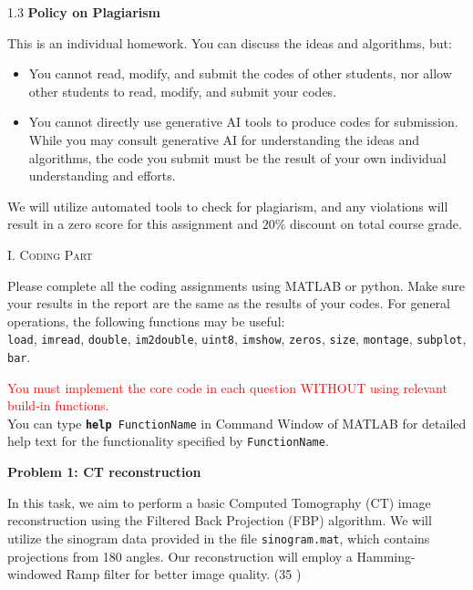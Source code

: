 \documentclass[A4paper, 11pt]{article}
\newcommand{\<}{\,\langle\,}
\renewcommand{\>}{\,\rangle}
\newcommand{\Pro}[1]{\textbf{\large{Problem #1}} \vspace*{1ex}}
\newcommand{\Pt}[1]{\textcolor{emph}{(#1 \ifthenelse{\equal{#1}{1}}{point}{points})}}
\newcommand{\0}{\mathbf{0}}
\newcommand{\1}{\mathbf{1}}
\begin{document}
\begin{spacing}{1.3}
\vspace*{2ex}
\textbf{\large{Policy on Plagiarism}}
\vspace*{1.5ex}

This is an individual homework. You can discuss the ideas and algorithms, but:
\begin{itemize} \setlength{\parskip}{0.5ex} \vspace*{-1.5ex}
    \item You cannot read, modify, and submit the codes of other students, nor allow other students to read, modify, and submit your codes.
    \item You cannot directly use generative AI tools to produce codes for submission. While you may consult generative AI for understanding the ideas and algorithms, the code you submit must be the result of your own individual understanding and efforts.
\end{itemize} \vspace*{-1.5ex}
We will utilize automated tools to check for plagiarism, and any violations will result in a zero score for this assignment and $20\%$ discount on total course grade.

\newpage

\begin{center}
    \textsc{I. Coding Part}
\end{center}

Please complete all the coding assignments using MATLAB or python. Make sure your results in the report are the same as the results of your codes. For general operations, the following functions may be useful:\\
\texttt{load}, \texttt{imread}, \texttt{double}, \texttt{im2double}, \texttt{uint8}, \texttt{imshow}, \texttt{zeros}, \texttt{size}, \texttt{montage}, \texttt{subplot}, \texttt{bar}.

\textcolor{red}{You must implement the core code in each question WITHOUT using relevant build-in functions.}\\


\vspace*{-3.75ex}
You can type \texttt{\textbf{help} FunctionName} in Command Window of MATLAB for detailed help text for the functionality specified by \texttt{FunctionName}.

\vspace*{6ex}

\Pro{1: CT reconstruction}

In this task, we aim to perform a basic Computed Tomography (CT) image reconstruction using the Filtered Back Projection (FBP) algorithm. We will utilize the sinogram data provided in the file \texttt{sinogram.mat}, which contains projections from 180 angles. Our reconstruction will employ a Hamming-windowed Ramp filter for better image quality. \Pt{35}


\end{spacing}
\end{document}
